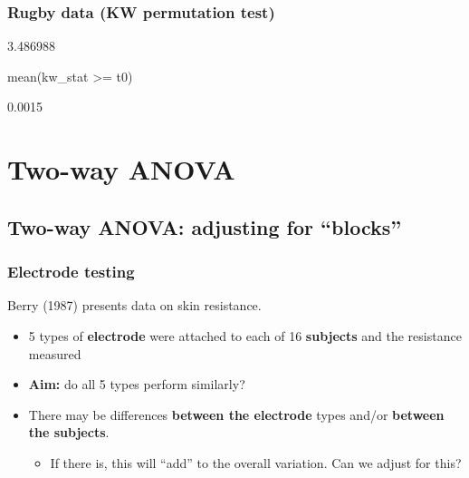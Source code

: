 \documentclass[a4paper]{article}\usepackage[]{graphicx}\usepackage[]{xcolor}
\begin{document}
\subsubsection{Rugby data (KW permutation test)}
\begin{Schunk}
\begin{Soutput}
[1] 3.486988
\end{Soutput}
\begin{Sinput}
mean(kw_stat >= t0)
\end{Sinput}
\begin{Soutput}
[1] 0.0015
\end{Soutput}
\end{Schunk}

\section{Two-way ANOVA}\label{sec:24}
\subsection{Two-way ANOVA: adjusting for ``blocks''}
\subsubsection{Electrode testing}
Berry (1987) presents data on skin resistance.
\begin{itemize}
	\item 5 types of \textcolor{mygreen}{\textbf{electrode}} were attached to each of 16 \textcolor{myred}{\textbf{subjects}} and the resistance measured
	\item \textbf{Aim:} do all 5 types perform similarly?
	\item There may be differences \textcolor{mygreen}{\textbf{between the electrode}} types and/or \textcolor{myred}{\textbf{between the subjects}}.
	\begin{itemize}
		\item If there is, this will ``add'' to the overall variation. Can we adjust for this?
	\end{itemize}
\end{itemize}
\end{document}
